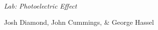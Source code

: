 {\LARGE {\em \noindent Lab: Photoelectric Effect}}

\large{\noindent Josh Diamond, John Cummings, \& George Hassel}
